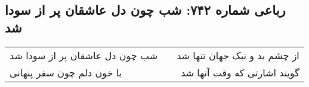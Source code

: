 \begin{center}
\section*{رباعی شماره ۷۴۲: شب چون دل عاشقان پر از سودا شد}
\label{sec:0742}
\begin{longtable}{l p{0.5cm} r}
شب چون دل عاشقان پر از سودا شد
&&
از چشم بد و نیک جهان تنها شد
\\
با خون دلم چون سفر پنهانی
&&
گویند اشارتی که وقت آنها شد
\\
\end{longtable}
\end{center}
